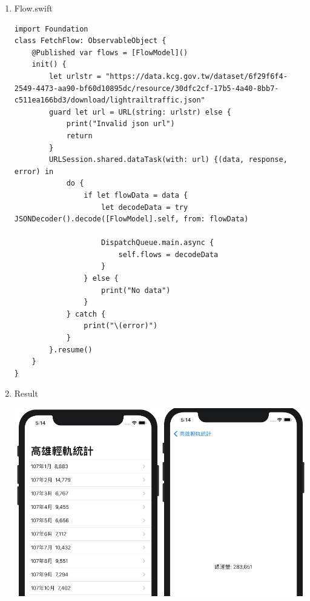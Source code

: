 \documentclass[a4paper,12pt]{article}
\begin{document}
\begin{enumerate}
\begin{lstlisting}
\end{lstlisting}
\item Flow.swift
\label{sec:org23221ee}
\lstset{breaklines=true,language=swift,label= ,caption= ,captionpos=b,firstnumber=1,numbers=left}
\begin{lstlisting}
import Foundation
class FetchFlow: ObservableObject {
    @Published var flows = [FlowModel]()
    init() {
        let urlstr = "https://data.kcg.gov.tw/dataset/6f29f6f4-2549-4473-aa90-bf60d10895dc/resource/30dfc2cf-17b5-4a40-8bb7-c511ea166bd3/download/lightrailtraffic.json"
        guard let url = URL(string: urlstr) else {
            print("Invalid json url")
            return
        }
        URLSession.shared.dataTask(with: url) {(data, response, error) in
            do {
                if let flowData = data {
                    let decodeData = try JSONDecoder().decode([FlowModel].self, from: flowData)

                    DispatchQueue.main.async {
                        self.flows = decodeData
                    }
                } else {
                    print("No data")
                }
            } catch {
                print("\(error)")
            }
        }.resume()
    }
}
\end{lstlisting}
\item Result
\label{sec:orgfb8159b}
\begin{center}
\includegraphics[width=500]{images/json-2.jpg}
\label{fig:JSON-2}
\end{center}
\end{enumerate}
\end{document}
